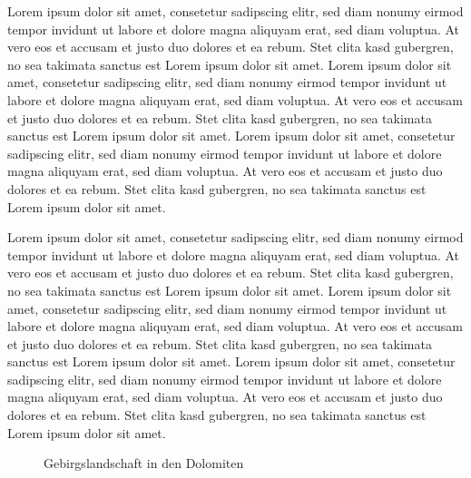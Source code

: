 \documentclass[
  11pt,
  a4paper,
]{tudscrreprt}
\begin{document}
Lorem ipsum dolor sit amet, consetetur sadipscing elitr, sed diam nonumy
eirmod tempor invidunt ut labore et dolore magna aliquyam erat, sed diam
voluptua. At vero eos et accusam et justo duo dolores et ea rebum. Stet
clita kasd gubergren, no sea takimata sanctus est Lorem ipsum dolor sit
amet. Lorem ipsum dolor sit amet, consetetur sadipscing elitr, sed diam
nonumy eirmod tempor invidunt ut labore et dolore magna aliquyam erat,
sed diam voluptua. At vero eos et accusam et justo duo dolores et ea
rebum. Stet clita kasd gubergren, no sea takimata sanctus est Lorem
ipsum dolor sit amet. Lorem ipsum dolor sit amet, consetetur sadipscing
elitr, sed diam nonumy eirmod tempor invidunt ut labore et dolore magna
aliquyam erat, sed diam voluptua. At vero eos et accusam et justo duo
dolores et ea rebum. Stet clita kasd gubergren, no sea takimata sanctus
est Lorem ipsum dolor sit amet.

Lorem ipsum dolor sit amet, consetetur sadipscing elitr, sed diam nonumy
eirmod tempor invidunt ut labore et dolore magna aliquyam erat, sed diam
voluptua. At vero eos et accusam et justo duo dolores et ea rebum. Stet
clita kasd gubergren, no sea takimata sanctus est Lorem ipsum dolor sit
amet. Lorem ipsum dolor sit amet, consetetur sadipscing elitr, sed diam
nonumy eirmod tempor invidunt ut labore et dolore magna aliquyam erat,
sed diam voluptua. At vero eos et accusam et justo duo dolores et ea
rebum. Stet clita kasd gubergren, no sea takimata sanctus est Lorem
ipsum dolor sit amet. Lorem ipsum dolor sit amet, consetetur sadipscing
elitr, sed diam nonumy eirmod tempor invidunt ut labore et dolore magna
aliquyam erat, sed diam voluptua. At vero eos et accusam et justo duo
dolores et ea rebum. Stet clita kasd gubergren, no sea takimata sanctus
est Lorem ipsum dolor sit amet.

\begin{figure}


\caption{\label{fig-mountains}Gebirgslandschaft in den Dolomiten}

\end{figure}%
\end{document}
